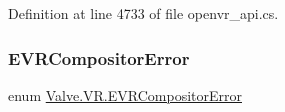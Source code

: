 Definition at line 4733 of file openvr\+\_\+api.\+cs.

\mbox{\label{namespace_valve_1_1_v_r_ac34ee1034fda668ccd45f57676ded81b}} 
\subsubsection{\texorpdfstring{EVRCompositorError}{EVRCompositorError}}
{\footnotesize\ttfamily enum \mbox{\hyperlink{namespace_valve_1_1_v_r_ac34ee1034fda668ccd45f57676ded81b}{Valve.\+V\+R.\+E\+V\+R\+Compositor\+Error}}\hspace{0.3cm}{\ttfamily [strong]}}

